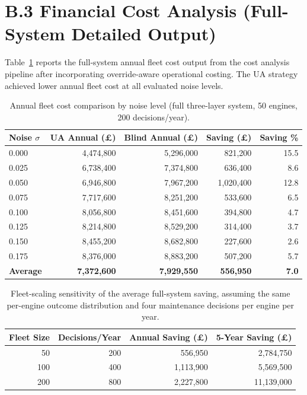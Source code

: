 \documentclass[12pt,a4paper]{report}
\begin{document}
\section*{B.3 Financial Cost Analysis (Full-System Detailed Output)}

Table~\ref{tab:app_cost_full} reports the full-system annual fleet cost output from the cost analysis pipeline after incorporating override-aware operational costing. The UA strategy achieved lower annual fleet cost at all evaluated noise levels.

\begin{table}[h]
\centering
\small
\caption{Annual fleet cost comparison by noise level (full three-layer system, 50 engines, 200 decisions/year).}
\label{tab:app_cost_full}
\setlength{\tabcolsep}{4pt}
\begin{tabular}{lrrrr}
\toprule
\textbf{Noise $\sigma$} & \textbf{UA Annual (\pounds)} & \textbf{Blind Annual (\pounds)} & \textbf{Saving (\pounds)} & \textbf{Saving \%} \\
\midrule
0.000 & 4,474,800 & 5,296,000 & 821,200 & 15.5 \\
0.025 & 6,738,400 & 7,374,800 & 636,400 & 8.6 \\
0.050 & 6,946,800 & 7,967,200 & 1,020,400 & 12.8 \\
0.075 & 7,717,600 & 8,251,200 & 533,600 & 6.5 \\
0.100 & 8,056,800 & 8,451,600 & 394,800 & 4.7 \\
0.125 & 8,214,800 & 8,529,200 & 314,400 & 3.7 \\
0.150 & 8,455,200 & 8,682,800 & 227,600 & 2.6 \\
0.175 & 8,376,000 & 8,883,200 & 507,200 & 5.7 \\
\midrule
\textbf{Average} & \textbf{7,372,600} & \textbf{7,929,550} & \textbf{556,950} & \textbf{7.0} \\
\bottomrule
\end{tabular}
\end{table}

\begin{table}[h]
\centering
\small
\caption{Fleet-scaling sensitivity of the average full-system saving, assuming the same per-engine outcome distribution and four maintenance decisions per engine per year.}
\label{tab:cost_scaling}
\setlength{\tabcolsep}{7pt}
\begin{tabular}{rrrr}
\toprule
\textbf{Fleet Size} & \textbf{Decisions/Year} & \textbf{Annual Saving (\pounds)} & \textbf{5-Year Saving (\pounds)} \\
\midrule
50  & 200 & 556,950   & 2,784,750 \\
100 & 400 & 1,113,900 & 5,569,500 \\
200 & 800 & 2,227,800 & 11,139,000 \\
\bottomrule
\end{tabular}
\end{table}
\end{document}
